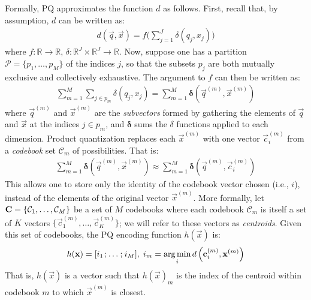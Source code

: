 Formally, PQ approximates the function $d$ as follows. First, recall that, by assumption, $d$ can be written as:
\begin{align*}
        d(\vec{q}, \vec{x}) = f \big( \sum_{j=1}^J \delta(q_j, x_j) \big)
\end{align*}
where $f: \mathbb{R} \rightarrow \mathbb{R}$, $\delta: \mathbb{R}^J \times \mathbb{R}^J \rightarrow \mathbb{R}$. Now, suppose one has a partition $\mathcal{P} = \{p_1,\ldots,p_M \}$ of the indices $j$, so that the subsets $p_j$ are both mutually exclusive and collectively exhaustive. %
The argument to $f$ can then be written as:
\begin{align}
        \sum_{m=1}^M \sum_{j \in p_m} \delta(q_j, x_j)
            = \sum_{m=1}^M \boldsymbol{\delta} \left( \vec{q}^{(m)}, \vec{x}^{(m)} \right)
\end{align}
where $\vec{q}^{(m)}$ and $\vec{x}^{(m)}$ are the \textit{subvectors} formed by gathering the elements of $\vec{q}$ and $\vec{x}$ at the indices $j \in p_m$, and $\boldsymbol{\delta}$ sums the $\delta$ functions applied to each dimension. Product quantization replaces each $\vec{x}^{(m)}$ with one vector $\vec{c}_i^{(m)}$ from a \textit{codebook} set $\mathcal{C}_m$ of possibilities. That is: %
\begin{align} \label{eq:pqDistNoLut}
        \sum_{m=1}^M \boldsymbol{\delta} \left( \vec{q}^{(m)}, \vec{x}^{(m)} \right) \approx \sum_{m=1}^M \boldsymbol{\delta} \left( \vec{q}^{(m)}, \vec{c}_i^{(m)} \right)
\end{align}
This allows one to store only the identity of the codebook vector chosen (i.e., $i$), instead of the elements of the original vector $\vec{x}^{(m)}$. More formally, let $\mathcal{\mathbf{C}} = \{\mathcal{C}_1,\ldots,\mathcal{C}_M\}$ be a set of $M$ codebooks where each codebook $\mathcal{C}_m $ is itself a set of $K$ vectors $\{\vec{c}_{1}^{(m)},\ldots,\vec{c}_{K}^{(m)}\}$; we will refer to these vectors as \textit{centroids}. Given this set of codebooks, the PQ encoding function $h(\vec{x})$ is:
\begin{align}
    h(\vec{x}) = [ i_1 \hspace{.25mm}; \hspace{.25mm} \ldots \hspace{.25mm}; \hspace{.25mm} i_M ], \hspace{1mm} i_m = \argmin_i d \left( \vec{c}_i^{(m)}, \vec{x}^{(m)} \right)%
\end{align}
That is, $h(\vec{x})$ is a vector such that $h(\vec{x})_m$ is the index of the centroid within codebook $m$ to which $\vec{x}^{(m)}$ is closest.

